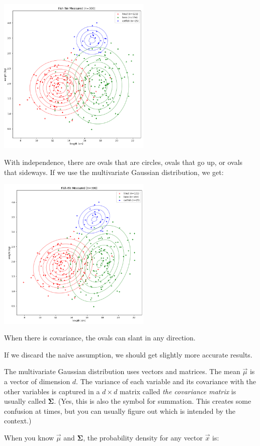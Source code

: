 \includegraphics[width=0.55\textwidth]{4_indep_density.png}

With independence, there are ovals that are circles,  ovals that go up, or ovals that sideways.  If we use the multivariate Gaussian distribution, we get:

\includegraphics[width=0.55\textwidth]{5_full.png}

When there is covariance,  the ovals can slant in any direction.

If we discard the naive assumption,  we should get slightly more accurate results.

The multivariate Gaussian distribution uses vectors and matrices.  The mean $\vec{\mu}$ is a vector of dimension $d$. The variance of each variable and its covariance with the other variables is captured in a $d \times d$ matrix called \textit{the covariance matrix} is usually called $\boldsymbol\Sigma$.  (Yes, this is also the symbol for summation.  This creates some confusion at times, but you can usually figure out which is intended by the context.)

When you know $\vec{\mu}$ and $\boldsymbol\Sigma$,  the probability density for any vector $\vec{x}$ is:

